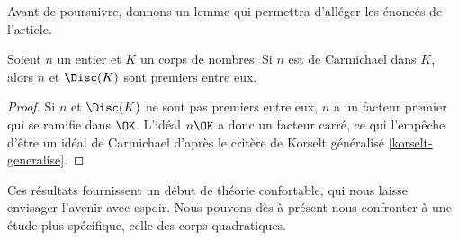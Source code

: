 Avant de poursuivre, donnons un lemme qui permettra d'alléger les énoncés de l'article.

\begin{lemme}
	Soient $n$ un entier et $K$ un corps de nombres. Si $n$ est de Carmichael dans $K$, alors $n$ et $\Disc(K)$ sont premiers entre eux.
\end{lemme}

\begin{proof}
	Si $n$ et $\Disc(K)$ ne sont pas premiers entre eux, $n$ a un facteur premier qui se ramifie dans $\OK$. L'idéal $n\OK$ a donc un facteur carré, ce qui l'empêche d'être un idéal de Carmichael d'après le critère de Korselt généralisé \ref{korselt-generalise}.
\end{proof}

Ces résultats fournissent un début de théorie confortable, qui nous laisse envisager l'avenir avec espoir. Nous pouvons dès à présent nous confronter à une étude plus spécifique, celle des corps quadratiques.
